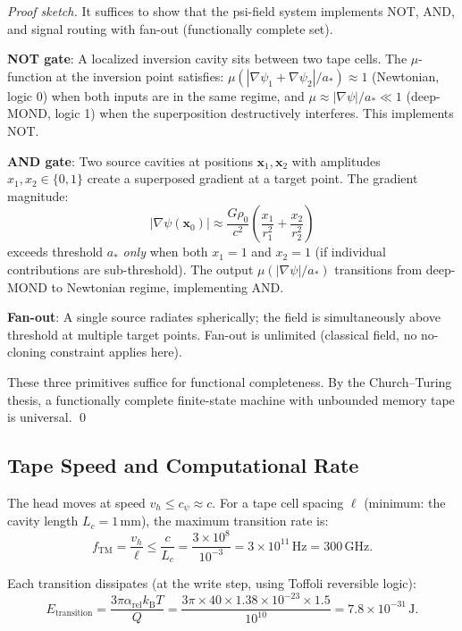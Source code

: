 \documentclass[11pt]{article}
\theoremstyle{definition}
\theoremstyle{remark}
\newcommand{\kB}{k_{\mathrm{B}}}
\newcommand{\astar}{a_*}
\newcommand{\arel}{\alpha_{\mathrm{rel}}}
\newcommand{\mufn}{\mu}
\begin{document}
\begin{proof}[Proof sketch]
It suffices to show that the psi-field system implements NOT, AND, and
signal routing with fan-out (functionally complete set).

\textbf{NOT gate}: A localized inversion cavity sits between two tape cells.
The $\mu$-function at the inversion point satisfies:
$\mufn(|\nabla\psi_1+\nabla\psi_2|/\astar) \approx 1$ (Newtonian, logic 0)
when both inputs are in the same regime, and
$\mufn \approx |\nabla\psi|/\astar \ll 1$ (deep-MOND, logic 1) when the
superposition destructively interferes. This implements NOT.

\textbf{AND gate}: Two source cavities at positions $\mathbf{x}_1,\mathbf{x}_2$
with amplitudes $x_1,x_2 \in \{0,1\}$ create a superposed gradient at a
target point. The gradient magnitude:
\begin{equation}
|\nabla\psi(\mathbf{x}_0)|
\approx \frac{G\rho_0}{c^2}\left(\frac{x_1}{r_1^2} + \frac{x_2}{r_2^2}\right)
\end{equation}
exceeds threshold $\astar$ \emph{only} when both $x_1=1$ and $x_2=1$
(if individual contributions are sub-threshold). The output
$\mufn(|\nabla\psi|/\astar)$ transitions from deep-MOND to Newtonian
regime, implementing AND.

\textbf{Fan-out}: A single source radiates spherically; the field is
simultaneously above threshold at multiple target points. Fan-out is
unlimited (classical field, no no-cloning constraint applies here).

These three primitives suffice for functional completeness. By the
Church--Turing thesis, a functionally complete finite-state machine with
unbounded memory tape is universal. \qed
\end{proof}

\subsection{Tape Speed and Computational Rate}

The head moves at speed $v_h \leq c_\psi \approx c$. For a tape cell spacing
$\ell$ (minimum: the cavity length $L_c = 1\,\mathrm{mm}$), the maximum
transition rate is:
\begin{equation}
f_{\mathrm{TM}} = \frac{v_h}{\ell} \leq \frac{c}{L_c}
= \frac{3\times10^8}{10^{-3}} = 3\times10^{11}\,\mathrm{Hz} = 300\,\mathrm{GHz}.
\end{equation}

Each transition dissipates (at the write step, using Toffoli reversible logic):
\begin{equation}
E_{\mathrm{transition}} = \frac{3\pi\arel\kB T}{Q}
= \frac{3\pi\times40\times1.38\times10^{-23}\times1.5}{10^{10}}
= 7.8\times10^{-31}\,\mathrm{J}.
\end{equation}
\end{document}

